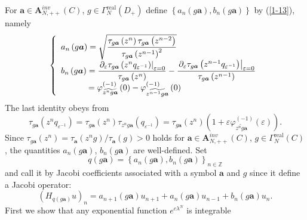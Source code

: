 \documentclass[a4paper]{article}%
\begin{document}
For $\boldsymbol{a}\in\boldsymbol{A}_{N,++}^{inv}\left(  C\right)  $,
$g\in\Gamma_{N}^{\operatorname{real}}\left(  D_{+}\right)  $ define $\left\{
a_{n}\left(  g\boldsymbol{a}\right)  ,b_{n}\left(  g\boldsymbol{a}\right)
\right\}  $ by (\ref{1-13}), namely%
\[
\left\{
\begin{array}
[c]{l}%
a_{n}\left(  g\boldsymbol{a}\right)  =\sqrt{\dfrac{\tau_{g\boldsymbol{a}%
}\left(  z^{n}\right)  \tau_{g\boldsymbol{a}}\left(  z^{n-2}\right)  }%
{\tau_{g\boldsymbol{a}}\left(  z^{n-1}\right)  ^{2}}}\\
b_{n}\left(  g\boldsymbol{a}\right)  =\dfrac{\left.  \partial_{\varepsilon
}\tau_{g\boldsymbol{a}}\left(  z^{n}q_{\varepsilon^{-1}}\right)  \right\vert
_{\varepsilon=0}}{\tau_{g\boldsymbol{a}}\left(  z^{n}\right)  }-\dfrac{\left.
\partial_{\varepsilon}\tau_{g\boldsymbol{a}}\left(  z^{n-1}q_{\varepsilon
^{-1}}\right)  \right\vert _{\varepsilon=0}}{\tau_{g\boldsymbol{a}}\left(
z^{n-1}\right)  }\\
\text{ \ \ \ \ \ \ \ \ }=\varphi_{\widetilde{z^{n}g\boldsymbol{a}}}^{\left(
-1\right)  }\left(  0\right)  -\varphi_{\widetilde{z^{n-1}g\boldsymbol{a}}%
}^{\left(  -1\right)  }\left(  0\right)
\end{array}
\right.
\]
The last identity obeys from%
\[
\tau_{g\boldsymbol{a}}\left(  z^{n}q_{\varepsilon^{-1}}\right)  =\tau
_{g\boldsymbol{a}}\left(  z^{n}\right)  \tau_{z^{n}g\boldsymbol{a}}\left(
q_{\varepsilon^{-1}}\right)  =\tau_{g\boldsymbol{a}}\left(  z^{n}\right)
\left(  1+\varepsilon\varphi_{\widetilde{z^{n}g\boldsymbol{a}}}^{\left(
-1\right)  }\left(  \varepsilon\right)  \right)  \text{.}%
\]
Since $\tau_{g\boldsymbol{a}}\left(  z^{n}\right)  =\tau_{\boldsymbol{a}%
}\left(  z^{n}g\right)  /\tau_{\boldsymbol{a}}\left(  g\right)  >0$ holds for
$\boldsymbol{a}\in\boldsymbol{A}_{N,++}^{inv}\left(  C\right)  $, $g\in
\Gamma_{N}^{\operatorname{real}}\left(  C\right)  $, the quantities
$a_{n}\left(  g\boldsymbol{a}\right)  $, $b_{n}\left(  g\boldsymbol{a}\right)
$ are well-defined. Set%
\[
q\left(  g\boldsymbol{a}\right)  =\left\{  a_{n}\left(  g\boldsymbol{a}%
\right)  ,b_{n}\left(  g\boldsymbol{a}\right)  \right\}  _{n\in\mathbb{Z}}%
\]
and call it by Jacobi coefficients associated with a symbol $\boldsymbol{a}$
and $g$ since it define a Jacobi operator:%
\[
\left(  H_{q\left(  g\boldsymbol{a}\right)  }u\right)  _{n}=a_{n+1}\left(
g\boldsymbol{a}\right)  u_{n+1}+a_{n}\left(  g\boldsymbol{a}\right)
u_{n-1}+b_{n}\left(  g\boldsymbol{a}\right)  u_{n}\text{.}%
\]
First we show that any exponential function $e^{c\lambda^{N}}$ is integrable
\end{document}
